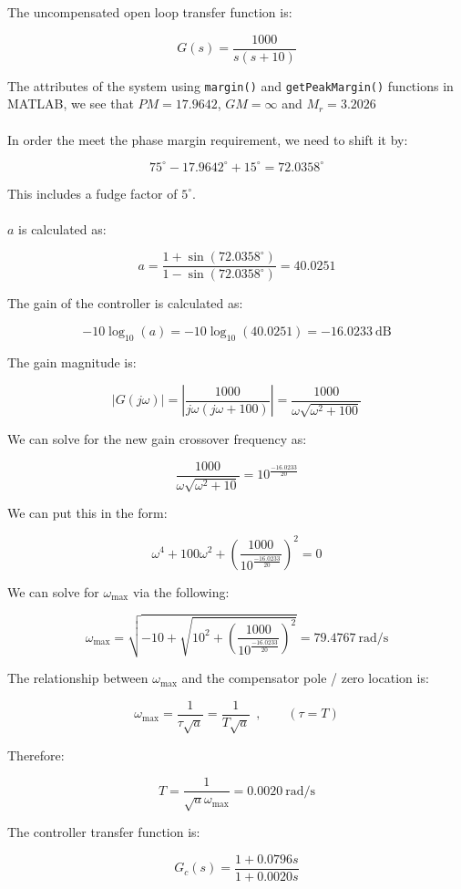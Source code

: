 \documentclass[12pt, letterpaper]{../assignment}
\begin{document}
The uncompensated open loop transfer function is:

$$ G (s) = \frac{1000}{s(s+10)} $$

The attributes of the system using \texttt{margin()} and \texttt{getPeakMargin()} functions in MATLAB,
we see that $PM = 17.9642$, $GM = \infty$ and $M_r = 3.2026$
\\\\
In order the meet the phase margin requirement, we need to shift it by:

$$ 75^\circ-17.9642^\circ+15^\circ = 72.0358^\circ$$

This includes a fudge factor of $5^\circ$.
\\\\
$a$ is calculated as:

$$ a = \frac{1+\sin(72.0358^\circ)}{1-\sin(72.0358^\circ)} = 40.0251 $$

The gain of the controller is calculated as:

$$ -10 \log_{10} (a) = -10 \log_{10} (40.0251) = -16.0233 \ \text{dB} $$

The gain magnitude is:

$$ |G(j\omega)| = \left| \frac{1000}{j\omega(j\omega+100)} \right| 
    = \frac{1000}{\omega \sqrt{\omega^2+100} }  $$

We can solve for the new gain crossover frequency as:

$$ \frac{1000}{\omega \sqrt{\omega^2+10}} = 10^{\frac{-16.0233 }{20}} $$

We can put this in the form:

$$ \omega^4 + 100\omega^2 + \left(\frac{1000}{10^{\frac{-16.0233 }{20}}}\right)^2 = 0 $$

We can solve for $\omega_\text{max}$ via the following:

$$ \omega_\text{max} = \sqrt{-10+\sqrt{10^2 + \left(\frac{1000}{10^{\frac{-16.0233 }{20}}}\right)^2}}
    = 79.4767 \ \text{rad/s} $$

The relationship between $\omega_\text{max}$ and the compensator pole / zero location is:

$$ \omega_\text{max} = \frac{1}{\tau \sqrt{a}} = \frac{1}{T \sqrt{a}} \ \ ,
    \ \ \ \ \ \ \ \ \  (\tau = T) $$

Therefore:

$$ T = \frac{1}{\sqrt{a} \omega_\text{max}} = 0.0020 \ \text{rad/s} $$

The controller transfer function is:

$$ G_c(s) = \frac{1+0.0796 s}{1 + 0.0020s} $$
\end{document}

